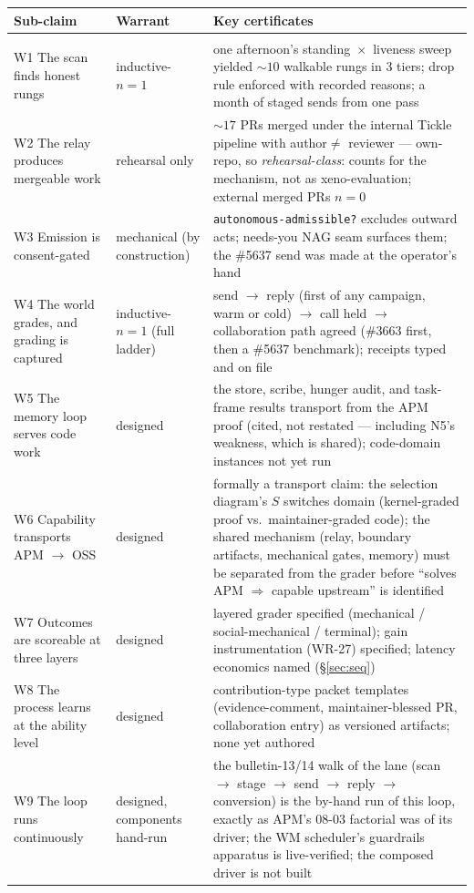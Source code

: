 \documentclass[11pt]{article}
\begin{document}
\begin{center}
\small
\begin{tabular}{p{} p{} p{}}
\textbf{Sub-claim} & \textbf{Warrant} & \textbf{Key certificates}\\[2pt]
\hline\\[-8pt]
W1 The scan finds honest rungs & inductive-$n{=}1$ & one afternoon's
standing~$\times$~liveness sweep yielded ${\sim}10$ walkable rungs in
3 tiers; drop rule enforced with recorded reasons; a month of staged
sends from one pass\\[3pt]
W2 The relay produces mergeable work & rehearsal only & ${\sim}17$
PRs merged under the internal Tickle pipeline with author${}\neq{}$%
reviewer --- own-repo, so \emph{rehearsal-class}: counts for the
mechanism, not as xeno-evaluation; external merged PRs $n{=}0$\\[3pt]
W3 Emission is consent-gated & mechanical (by construction) &
\texttt{autonomous-admissible?} excludes outward acts; needs-you NAG
seam surfaces them; the \#5637 send was made at the operator's
hand\\[3pt]
W4 The world grades, and grading is captured & inductive-$n{=}1$
(full ladder) & send $\to$ reply (first of any campaign, warm or
cold) $\to$ call held $\to$ collaboration path agreed (\#3663 first,
then a \#5637 benchmark); receipts typed and on file\\[3pt]
W5 The memory loop serves code work & designed & the store, scribe,
hunger audit, and task-frame results transport from the APM proof
(cited, not restated --- including N5's weakness, which is shared);
code-domain instances not yet run\\[3pt]
W6 Capability transports APM $\to$ OSS & designed & formally a
transport claim: the selection diagram's $S$ switches domain
(kernel-graded proof vs.\ maintainer-graded code); the shared
mechanism (relay, boundary artifacts, mechanical gates, memory) must
be separated from the grader before ``solves APM $\Rightarrow$
capable upstream'' is identified\\[3pt]
W7 Outcomes are scoreable at three layers & designed & layered
grader specified (mechanical / social-mechanical / terminal);
gain instrumentation (WR-27) specified; latency economics named
(\S\ref{sec:seq})\\[3pt]
W8 The process learns at the ability level & designed &
contribution-type packet templates (evidence-comment,
maintainer-blessed PR, collaboration entry) as versioned artifacts;
none yet authored\\[3pt]
W9 The loop runs continuously & designed, components hand-run & the
bulletin-13/14 walk of the lane (scan $\to$ stage $\to$ send $\to$
reply $\to$ conversion) is the by-hand run of this loop, exactly as
APM's 08-03 factorial was of its driver; the WM scheduler's
guardrails apparatus is live-verified; the composed driver is not
built\\
\hline
\end{tabular}
\end{center}
\end{document}
